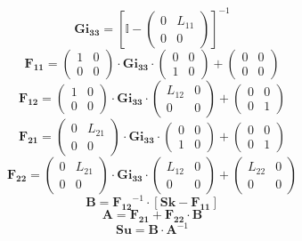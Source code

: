 \[ \mathbf{Gi_{33}} = \left[\mathbb{I} -\left(\begin{smallmatrix} 0 &
L_{11} \\ 0 & 0 \end{smallmatrix}\right)\right]^{-1} \]
\[ \mathbf{F_{11}} = \left(\begin{smallmatrix} 1 & 0 \\ 0 & 0
\end{smallmatrix}\right) \cdot\mathbf{Gi_{33}}\cdot
\left(\begin{smallmatrix} 0 & 0 \\ 1 & 0 \end{smallmatrix}\right) +
\left(\begin{smallmatrix} 0 & 0 \\ 0 & 0 \end{smallmatrix}\right) \]
\[ \mathbf{F_{12}} = \left(\begin{smallmatrix} 1 & 0 \\ 0 & 0
\end{smallmatrix}\right) \cdot\mathbf{Gi_{33}}\cdot
\left(\begin{smallmatrix} L_{12} & 0 \\ 0 & 0 \end{smallmatrix}\right)
+ \left(\begin{smallmatrix} 0 & 0 \\ 0 & 1 \end{smallmatrix}\right) \]
\[ \mathbf{F_{21}} = \left(\begin{smallmatrix} 0 & L_{21} \\ 0 & 0
\end{smallmatrix}\right) \cdot\mathbf{Gi_{33}}\cdot
\left(\begin{smallmatrix} 0 & 0 \\ 1 & 0 \end{smallmatrix}\right) +
\left(\begin{smallmatrix} 0 & 0 \\ 0 & 1 \end{smallmatrix}\right) \]
\[ \mathbf{F_{22}} = \left(\begin{smallmatrix} 0 & L_{21} \\ 0 & 0
\end{smallmatrix}\right) \cdot\mathbf{Gi_{33}}\cdot
\left(\begin{smallmatrix} L_{12} & 0 \\ 0 & 0 \end{smallmatrix}\right)
+ \left(\begin{smallmatrix} L_{22} & 0 \\ 0 & 0
\end{smallmatrix}\right) \]
\[ \mathbf{B}=\mathbf{F_{12}}^{-1}\cdot\left[ \mathbf{Sk} -
\mathbf{F_{11}} \right]  \]
\[ \mathbf{A}=\mathbf{F_{21}}+ \mathbf{F_{22}}\cdot\mathbf{B} \]
\[ \mathbf{Su} = \mathbf{B} \cdot \mathbf{A}^{-1} \]

